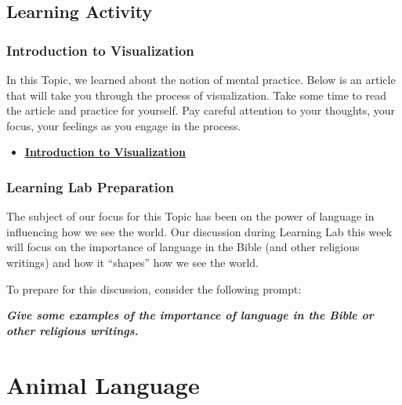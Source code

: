 \documentclass[
]{book}
\providecommand{\tightlist}{%
  \setlength{\itemsep}{0pt}\setlength{\parskip}{0pt}}
\begin{document}
\hypertarget{learning-activity-1}{%
\subsection*{Learning Activity}\label{learning-activity-1}}

\begin{reflect}
\hypertarget{introduction-to-visualization}{%
\subsubsection*{Introduction to Visualization}\label{introduction-to-visualization}}

In this Topic, we learned about the notion of mental practice. Below is an article that will take you through the process of visualization. Take some time to read the article and practice for yourself. Pay careful attention to your thoughts, your focus, your feelings as you engage in the process.

\begin{itemize}
\tightlist
\item
  \href{https://www.forbes.com/sites/bhaligill/2017/06/22/new-to-visualization-here-are-5-steps-to-get-you-started/\#60dafcdc6e3f}{\textbf{Introduction to Visualization}}
\end{itemize}

\hypertarget{learning-lab-preparation-2}{%
\subsubsection*{Learning Lab Preparation}\label{learning-lab-preparation-2}}

The subject of our focus for this Topic has been on the power of language in influencing how we see the world. Our discussion during Learning Lab this week will focus on the importance of language in the Bible (and other religious writings) and how it ``shapes'' how we see the world.

To prepare for this discussion, consider the following prompt:

\textbf{\emph{Give some examples of the importance of language in the Bible or other religious writings.}}
\end{reflect}

\hypertarget{animal-language}{%
\section{Animal Language}\label{animal-language}}
\end{document}
